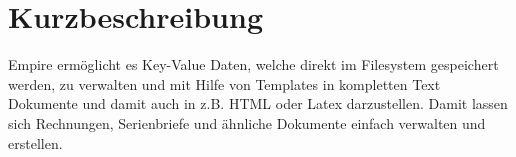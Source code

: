 
\section{Kurzbeschreibung}

Empire ermöglicht es Key-Value Daten, welche direkt im Filesystem gespeichert werden, zu verwalten und mit Hilfe von Templates in kompletten Text Dokumente und damit auch in z.B. HTML oder Latex darzustellen. Damit lassen sich Rechnungen, Serienbriefe und ähnliche Dokumente einfach verwalten und erstellen.